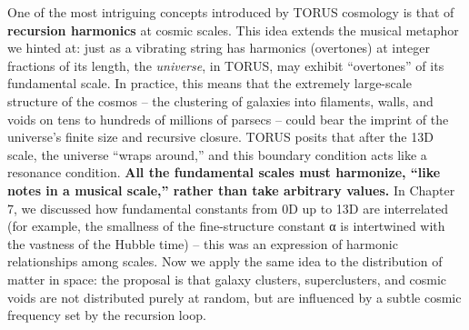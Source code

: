 \documentclass[
]{article}
\begin{document}
One of the most intriguing concepts introduced by TORUS cosmology is
that of \textbf{recursion harmonics} at cosmic scales. This idea extends
the musical metaphor we hinted at: just as a vibrating string has
harmonics (overtones) at integer fractions of its length, the
\emph{universe}, in TORUS, may exhibit ``overtones'' of its fundamental
scale. In practice, this means that the extremely large-scale structure
of the cosmos -- the clustering of galaxies into filaments, walls, and
voids on tens to hundreds of millions of parsecs -- could bear the
imprint of the universe's finite size and recursive closure. TORUS
posits that after the 13D scale, the universe ``wraps around,'' and this
boundary condition acts like a resonance condition. \textbf{All the
fundamental scales must harmonize, ``like notes in a musical scale,''
rather than take arbitrary values\hspace{0pt}.} In Chapter 7, we
discussed how fundamental constants from 0D up to 13D are interrelated
(for example, the smallness of the fine-structure constant α is
intertwined with the vastness of the Hubble time) -- this was an
expression of harmonic relationships among scales. Now we apply the same
idea to the distribution of matter in space: the proposal is that galaxy
clusters, superclusters, and cosmic voids are not distributed purely at
random, but are influenced by a subtle cosmic frequency set by the
recursion loop.
\end{document}
